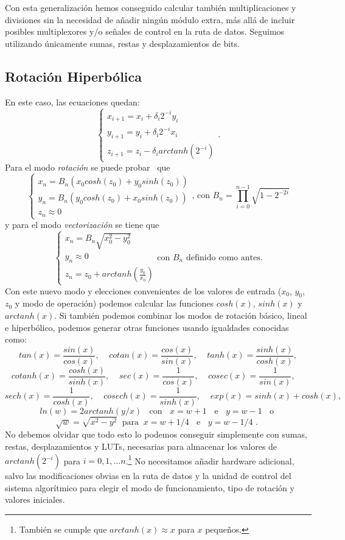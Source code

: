 \documentclass[12pt, a4paper]{article}
\begin{document}
Con esta generalización hemos conseguido calcular también multiplicaciones y divisiones sin la necesidad de añadir ningún módulo extra, más allá de incluir posibles multiplexores y/o señales de control en la ruta de datos. Seguimos utilizando únicamente sumas, restas y desplazamientos de bits.
 \subsection{Rotación Hiperbólica}
 En este caso, las ecuaciones quedan:
 \[
\begin{cases}
x_{i+1}=x_{i}+\delta_{i}2^{-i}y_i\\
y_{i+1}=y_{i}+\delta_{i}2^{-i}x_i\\
z_{i+1}=z_{i}-\delta_{i} arctanh(2^{-i})
\end{cases}.
\]
Para el modo \textit{rotación} se puede probar~\cite{10.1145/1478786.1478840} que
 \[
\begin{cases}
x_n=B_n(x_0cosh(z_0)+y_0sinh(z_0))\\
y_n=B_n(y_0cosh(z_0)+x_0sinh(z_0))\\
z_n\approx 0
\end{cases}
\textrm{, con } B_n =\prod_{i=0}^{n-1}\sqrt{1-2^{-2i}}
\]
y para el modo \textit{vectorización} se tiene que 
\[
\begin{cases}
x_n=B_n\sqrt{x_0^2 -y_0^2}\\
y_n\approx0\\
z_n= z_0+arctanh(\frac{y_0}{x_0})
\end{cases} \textrm{con } B_n \textrm{ definido como antes.}
\]
Con este nuevo modo y elecciones convenientes de los valores de entrada ($x_0$, $y_0$, $z_0$ y modo de operación) podemos calcular las funciones $cosh(x)$, $sinh(x)$ y $arctanh(x)$. Si también podemos combinar los modos de rotación básico, lineal e hiperbólico, podemos generar otras funciones usando igualdades conocidas como:
\[tan(x)=\frac{sin(x)}{cos(x)},\;\;\;\; cotan(x)=\frac{cos(x)}{sin(x)},\;\;\;\; tanh(x)=\frac{sinh(x)}{cosh(x)},\]
\[cotanh(x)=\frac{cosh(x)}{sinh(x)}, \;\;\;\;sec(x)=\frac{1}{cos(x)},\;\;\;\; cosec(x)=\frac{1}{sin(x)},\;\;\;\; \]
\[sech(x)=\frac{1}{cosh(x)},\;\;\;\; cosech(x)=\frac{1}{sinh(x)},\;\;\;\; exp(x)=sinh(x)+cosh(x),\]
\[ln(w)=2arctanh(y/x)\;\; \textrm{ con }\;\;x=w+1\;\;\textrm{ e }\;\;y=w-1\;\;\textrm{ o }\]
\[\sqrt{w}=\sqrt{x^2-y^2} \;\; \textrm{para}\;\; x=w+1/4 \;\;\textrm{ e }\;\; y=w-1/4 \textrm{ . }\]
No debemos olvidar que todo esto lo podemos conseguir simplemente con sumas, restas, desplazamientos y LUTs, necesarias para almacenar los valores de $arctanh(2^{-i})$ para $i = 0, 1,\ldots n$.\footnote{También se cumple que $arctanh(x)\approx x$ para $x$ pequeños.} No necesitamos añadir hardware adicional, salvo las modificaciones obvias en la ruta de datos y la unidad de control del sistema algorítmico para elegir el modo de funcionamiento, tipo de rotación y valores iniciales.
\end{document}
